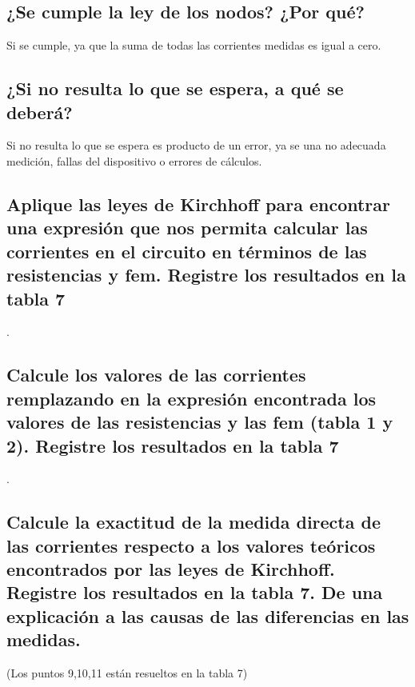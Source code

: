 \documentclass[letterpaper, 12pt]{article}
\begin{document}
\subsection{¿Se cumple la ley de los nodos? ¿Por qué?}

Si se cumple, ya que la suma de todas las corrientes
medidas es igual a cero.

\subsection{¿Si no resulta lo que se espera, a qué se deberá?}

Si no resulta lo que se espera es producto de un error, ya
se una no adecuada medición, fallas del dispositivo o
errores de cálculos.

\subsection{Aplique las leyes de Kirchhoff para encontrar una expresión que nos permita calcular las
	corrientes en el circuito en términos de las resistencias y fem. Registre los resultados en
	la tabla 7}

.
\subsection{Calcule los valores de las corrientes remplazando en la expresión encontrada los valores
	de las resistencias y las fem (tabla 1 y 2). Registre los resultados en la tabla 7}

.
\subsection{Calcule la exactitud de la medida directa de las corrientes respecto a los valores teóricos
	encontrados por las leyes de Kirchhoff. Registre los resultados en la tabla 7. De una
	explicación a las causas de las diferencias en las medidas.}

(Los puntos 9,10,11 están resueltos en la tabla 7)
\end{document}
